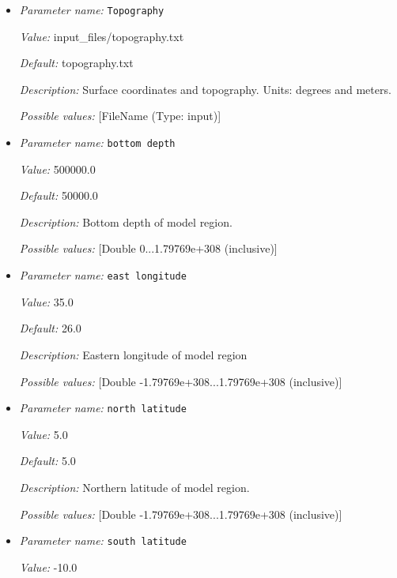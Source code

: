 \begin{itemize}
\item {\it Parameter name:} {\tt Topography}
\label{parameters:Geometry model/Africa/Topography}


{\it Value:} input_files/topography.txt


{\it Default:} topography.txt


{\it Description:} Surface coordinates and topography. Units: degrees and meters.


{\it Possible values:} [FileName (Type: input)]
\item {\it Parameter name:} {\tt bottom depth}
\label{parameters:Geometry model/Africa/bottom depth}


{\it Value:} 500000.0


{\it Default:} 50000.0


{\it Description:} Bottom depth of model region.


{\it Possible values:} [Double 0...1.79769e+308 (inclusive)]
\item {\it Parameter name:} {\tt east longitude}
\label{parameters:Geometry model/Africa/east longitude}


{\it Value:} 35.0


{\it Default:} 26.0


{\it Description:} Eastern longitude of model region


{\it Possible values:} [Double -1.79769e+308...1.79769e+308 (inclusive)]
\item {\it Parameter name:} {\tt north latitude}
\label{parameters:Geometry model/Africa/north latitude}


{\it Value:} 5.0


{\it Default:} 5.0


{\it Description:} Northern latitude of model region.


{\it Possible values:} [Double -1.79769e+308...1.79769e+308 (inclusive)]
\item {\it Parameter name:} {\tt south latitude}
\label{parameters:Geometry model/Africa/south latitude}


{\it Value:} -10.0



\end{itemize}

